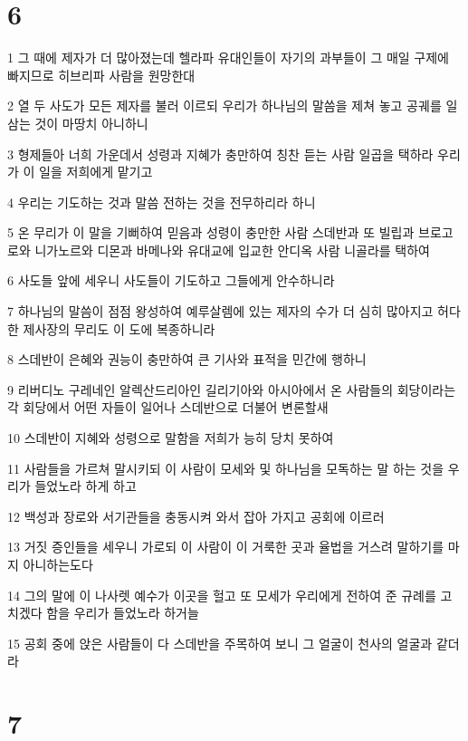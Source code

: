 \chapter{6}

\par 1 그 때에 제자가 더 많아졌는데 헬라파 유대인들이 자기의 과부들이 그 매일 구제에 빠지므로 히브리파 사람을 원망한대
\par 2 열 두 사도가 모든 제자를 불러 이르되 우리가 하나님의 말씀을 제쳐 놓고 공궤를 일삼는 것이 마땅치 아니하니
\par 3 형제들아 너희 가운데서 성령과 지혜가 충만하여 칭찬 듣는 사람 일곱을 택하라 우리가 이 일을 저희에게 맡기고
\par 4 우리는 기도하는 것과 말씀 전하는 것을 전무하리라 하니
\par 5 온 무리가 이 말을 기뻐하여 믿음과 성령이 충만한 사람 스데반과 또 빌립과 브로고로와 니가노르와 디몬과 바메나와 유대교에 입교한 안디옥 사람 니골라를 택하여
\par 6 사도들 앞에 세우니 사도들이 기도하고 그들에게 안수하니라
\par 7 하나님의 말씀이 점점 왕성하여 예루살렘에 있는 제자의 수가 더 심히 많아지고 허다한 제사장의 무리도 이 도에 복종하니라
\par 8 스데반이 은혜와 권능이 충만하여 큰 기사와 표적을 민간에 행하니
\par 9 리버디노 구레네인 알렉산드리아인 길리기아와 아시아에서 온 사람들의 회당이라는 각 회당에서 어떤 자들이 일어나 스데반으로 더불어 변론할새
\par 10 스데반이 지혜와 성령으로 말함을 저희가 능히 당치 못하여
\par 11 사람들을 가르쳐 말시키되 이 사람이 모세와 및 하나님을 모독하는 말 하는 것을 우리가 들었노라 하게 하고
\par 12 백성과 장로와 서기관들을 충동시켜 와서 잡아 가지고 공회에 이르러
\par 13 거짓 증인들을 세우니 가로되 이 사람이 이 거룩한 곳과 율법을 거스려 말하기를 마지 아니하는도다
\par 14 그의 말에 이 나사렛 예수가 이곳을 헐고 또 모세가 우리에게 전하여 준 규례를 고치겠다 함을 우리가 들었노라 하거늘
\par 15 공회 중에 앉은 사람들이 다 스데반을 주목하여 보니 그 얼굴이 천사의 얼굴과 같더라

\chapter{7}

